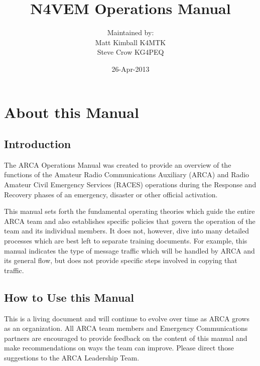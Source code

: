 \documentclass[pdflatex,letterpaper,twoside,12pt]{book}
\title             {N4VEM Operations Manual}
\author            {Maintained by:\\Matt Kimball K4MTK\\Steve Crow KG4PEQ}
\date              {26-Apr-2013}
\begin{document}
\arcaTitlePage
\skipToTOC
\arcaTOC


\chapter{About this Manual}

\section{Introduction}

The ARCA Operations Manual was created to provide an overview of the functions of the Amateur Radio Communications Auxiliary (ARCA) and Radio Amateur Civil Emergency Services (RACES) operations during the Response and Recovery phases of an emergency, disaster or other official activation.

This manual sets forth the fundamental operating theories which guide the entire ARCA team and also establishes specific policies that govern the operation of the team and its individual members.  It does not, however, dive into many detailed processes which are best left to separate training documents.  For example, this manual indicates the type of message traffic which will be handled by ARCA and its general flow, but does not provide specific steps involved in copying that traffic.


\section{How to Use this Manual}

This is a living document and will continue to evolve over time as ARCA grows as an organization.  All ARCA team members and Emergency Communications partners are encouraged to provide feedback on the content of this manual and make recommendations on ways the team can improve.  Please direct those suggestions to the ARCA Leadership Team.
\end{document}
